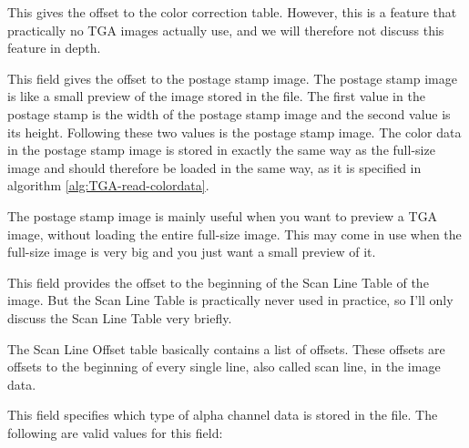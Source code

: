 


This gives the offset to the color correction table. However, this is
a feature that practically no TGA images actually use, and we will
therefore not discuss this feature in depth.


This field gives the offset to the postage stamp image. The postage
stamp image is like a small preview of the image stored in the
file. The first value in the postage stamp is the width of the postage
stamp image and the second value is its height. Following these two
values is the postage stamp image. The color data in the postage stamp
image is stored in exactly the same way as the full-size image and
should therefore be loaded in the same way, as it is specified in
algorithm \ref{alg:TGA-read-colordata}.

The postage stamp image is mainly useful when you want to preview a
TGA image, without loading the entire full-size image. This may come
in use when the full-size image is very big and you just want a small
preview of it.


This field provides the offset to the beginning of the Scan Line Table
of the image. But the Scan Line Table is practically never used in
practice, so I'll only discuss the Scan Line Table very briefly.

The Scan Line Offset table basically contains a list of offsets. These
offsets are offsets to the beginning of every single line, also called
scan line, in the image data.


This field specifies which type of alpha channel data is stored in the
file. The following are valid values for this field:

